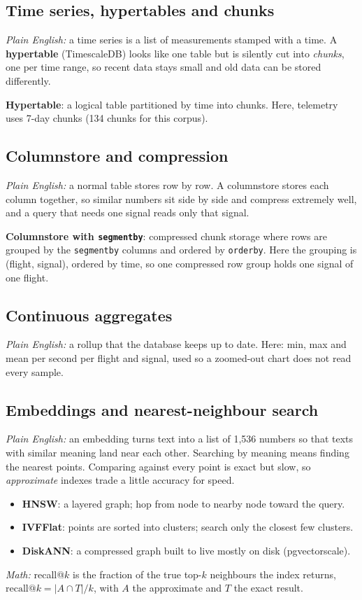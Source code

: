 \documentclass[11pt,a4paper]{article}
\newcommand{\code}[1]{\texttt{#1}}
\begin{document}
\subsection{Time series, hypertables and chunks}
\emph{Plain English:} a time series is a list of measurements stamped with a time. A \textbf{hypertable} (TimescaleDB) looks like one table but is silently cut into \emph{chunks}, one per time range, so recent data stays small and old data can be stored differently.
\begin{definition}
\textbf{Hypertable}: a logical table partitioned by time into chunks. Here, telemetry uses 7-day chunks (134 chunks for this corpus).
\end{definition}

\subsection{Columnstore and compression}
\emph{Plain English:} a normal table stores row by row. A columnstore stores each column together, so similar numbers sit side by side and compress extremely well, and a query that needs one signal reads only that signal.
\begin{definition}
\textbf{Columnstore with \code{segmentby}}: compressed chunk storage where rows are grouped by the \code{segmentby} columns and ordered by \code{orderby}. Here the grouping is (flight, signal), ordered by time, so one compressed row group holds one signal of one flight.
\end{definition}

\subsection{Continuous aggregates}
\emph{Plain English:} a rollup that the database keeps up to date. Here: min, max and mean per second per flight and signal, used so a zoomed-out chart does not read every sample.

\subsection{Embeddings and nearest-neighbour search}
\emph{Plain English:} an embedding turns text into a list of 1,536 numbers so that texts with similar meaning land near each other. Searching by meaning means finding the nearest points. Comparing against every point is exact but slow, so \emph{approximate} indexes trade a little accuracy for speed.
\begin{itemize}
  \item \textbf{HNSW}: a layered graph; hop from node to nearby node toward the query.
  \item \textbf{IVFFlat}: points are sorted into clusters; search only the closest few clusters.
  \item \textbf{DiskANN}: a compressed graph built to live mostly on disk (pgvectorscale).
\end{itemize}
\emph{Math:} recall@$k$ is the fraction of the true top-$k$ neighbours the index returns, $\text{recall}@k=|A\cap T|/k$, with $A$ the approximate and $T$ the exact result.
\end{document}
